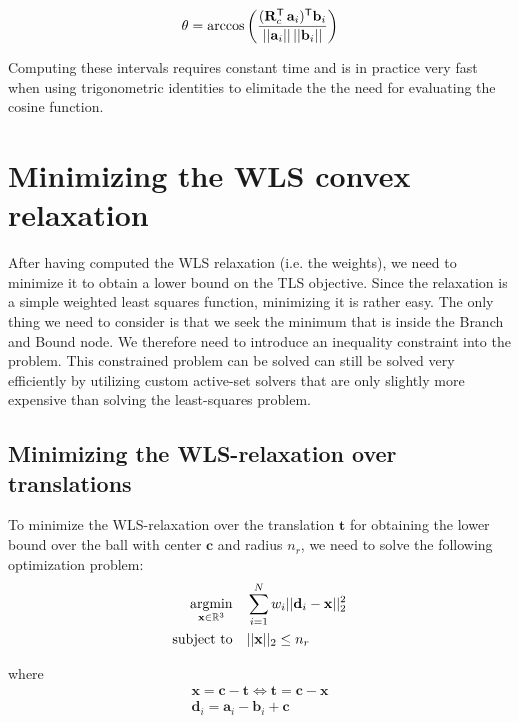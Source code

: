 \begin{equation}
	\begin{aligned}
		\theta = \arccos \left( \frac{(\mathbf{R}_c^{\mathsf{T}} \, \mathbf{a}_i )^{\mathsf{T}} \mathbf{b}_i}{|| \mathbf{a}_i || \, || \mathbf{b}_i ||} \right)
	\end{aligned}
\end{equation}

Computing these intervals requires constant time and is in practice very fast when using trigonometric identities to elimitade the the need for evaluating the cosine function.


\section{Minimizing the WLS convex relaxation}
After having computed the WLS relaxation (i.e. the weights), we need to minimize it to obtain a lower bound on the TLS objective. 
Since the relaxation is a simple weighted least squares function, minimizing it is rather easy. The only thing we need to consider is that we seek the minimum that is inside the Branch and Bound node. We therefore need to introduce an inequality constraint into the problem.
This constrained problem can be solved can still be solved very efficiently by utilizing custom active-set solvers that are only slightly more expensive than solving the least-squares problem.

\subsection{Minimizing the WLS-relaxation over translations}

To minimize the WLS-relaxation over the translation $\mathbf{t}$ for obtaining the lower bound over the ball with center $\mathbf{c}$ and radius $n_r$, we need to solve the following optimization problem:
\begin{equation}
	\label{eq:tls-twls-constrained}
	\begin{aligned}
		\operatorname*{argmin}_{\mathbf{x} \in \mathbb{R}^3} \quad &\sum_{i=1}^{N} w_i ||\mathbf{d}_i - \mathbf{x}||_2^2 \\
		\text{subject to} \quad  &||\mathbf{x}||_2 \leq n_r
	\end{aligned}
\end{equation}

where 
\begin{equation}
	\begin{aligned}
		\mathbf{x} = \mathbf{c} - \mathbf{t}  \iff  \mathbf{t} = \mathbf{c} - \mathbf{x}\\
		\mathbf{d}_i = \mathbf{a}_i - \mathbf{b}_i + \mathbf{c}
	\end{aligned}
\end{equation}

